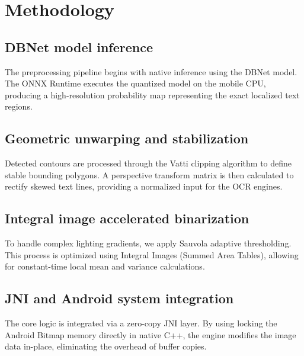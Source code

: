 \chapter{Methodology}
\section{DBNet model inference}
The preprocessing pipeline begins with native inference using the DBNet model. The ONNX Runtime executes the quantized model on the mobile CPU, producing a high-resolution probability map representing the exact localized text regions.

\section{Geometric unwarping and stabilization}
Detected contours are processed through the Vatti clipping algorithm to define stable bounding polygons. A perspective transform matrix is then calculated to rectify skewed text lines, providing a normalized input for the OCR engines.

\section{Integral image accelerated binarization}
To handle complex lighting gradients, we apply Sauvola adaptive thresholding. This process is optimized using Integral Images (Summed Area Tables), allowing for constant-time local mean and variance calculations.

\section{JNI and Android system integration}
The core logic is integrated via a zero-copy JNI layer. By using locking the Android Bitmap memory directly in native C++, the engine modifies the image data in-place, eliminating the overhead of buffer copies.


